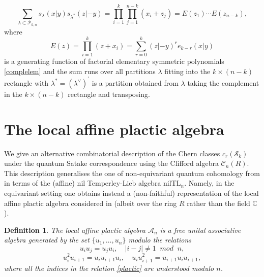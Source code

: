 \documentclass[12pt]{amsart}
\newcommand{\C}{\mathbb{C}}
\newcommand{\cS}{\mathcal{S}}
\newcommand{\mc}[1]{\mathcal{#1}}
\newcommand{\ring}{R}
\newtheorem{defn}{Definition}[section]
\numberwithin{equation}{section}
\numberwithin{figure}{section}
\begin{document}
\begin{equation}\label{Cauchydual}
    \sum\limits_{\lambda \subset \mathcal{P}_{k,n}} s_{\lambda}(x|y) s_{\lambda^{*}}(z|-y) = \prod\limits_{i = 1}^k \prod\limits_{j = 1}^{n - k}(x_i + z_j) = E(z_1) \cdots E(z_{n - k}),
\end{equation}
where 
\[
E(z) = \prod\limits_{i = 1}^k(z + x_i) = \sum\limits_{r = 0}^k (z|-y)^r e_{k - r}(x|y)
\]
is a generating function of factorial elementary symmetric polynomials \eqref{complelem} and the sum runs over all partitions $\lambda$ fitting into the $k\times (n - k)$ rectangle with $\lambda^{*} = (\lambda^{\vee})^{'}$ is a partition obtained from $\lambda$ taking the complement in the $k \times (n-k)$ rectangle and transposing. 
\section{The local affine plactic algebra}\label{app:B}
We give an alternative combinatorial description of the Chern classes $c_r(\cS_k)$ under the quantum Satake correspondence using the Clifford algebra $\mc{C}_n(\ring)$. This description generalises the one of non-equivariant quantum cohomology from \cite{Post05} in terms of the (affine) nil Temperley-Lieb algebra $\mathrm{nilTL}_n$. Namely, in the equivariant setting one obtains instead a (non-faithful) representation of the local affine plactic algebra considered in \cite{korffstroppel2010} (albeit over the ring $\ring$ rather than the field $\C$).

 \begin{defn} \label{defplactic}
        The local affine plactic algebra $\mathcal{A}_n$ is a free unital associative algebra generated by the set $\{u_1, \ldots, u_{n} \}$ modulo the relations
        \begin{equation}
        \label{plactic_commute}
        u_i u_j = u_j u_i, \quad |i - j| \neq 1 \;\; mod \;\; n, 
        \end{equation}
        \begin{equation}
        \label{plactic}
        u_i^2 u_{i + 1} = u_i u_{i + 1} u_i, \quad u_i u_{i + 1}^2 = u_{i + 1} u_i u_{i + 1},
        \end{equation}
        where all the indices in the relation \eqref{plactic} are understood modulo $n$. 
    \end{defn}
\end{document}
